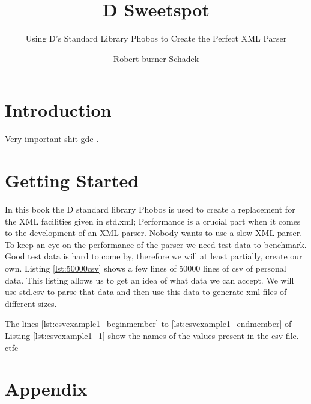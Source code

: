 \documentclass[a4paper,openright,BCOR20mm]{scrbook}
\author{Robert burner Schadek}
\title{D Sweetspot}
\subtitle{Using D's Standard Library Phobos to Create the Perfect XML Parser}
\begin{document}
\maketitle
\tableofcontents

\chapter{Introduction}
Very important shit \gls{gdc} \cite{Alexandrescu:2010}.

\chapter{Getting Started}
In this book the D standard library Phobos is used to create a replacement for
the XML facilities given in std.xml;
Performance is a crucial part when it comes to the development of an XML parser.
Nobody wants to use a slow XML parser.
To keep an eye on the performance of the parser we need test data to
benchmark.
Good test data is hard to come by, therefore we will at least partially,
create our own.
Listing \ref{lst:50000csv} shows a few lines of 50000 lines of \gls{csv} of
personal data.
%
This listing allows us to get an idea of what data we can accept.
We will use std.csv to parse that data and then use this data to generate
\gls{xml} files of different sizes.

The lines \ref{lst:csvexample1_beginmember} to \ref{lst:csvexample1_endmember}
of Listing \ref{lst:csvexample1_1} show the names of the values present in the csv
file.
\gls{ctfe}

%
%

\chapter*{Appendix}
\appendix
{} \label{appendix}
\cleardoublepage

\label{glossary}
\printnoidxglossary

\cleardoublepage
{}\label{acronyms}
\printnoidxglossary[type=acronym]

\cleardoublepage
{}\label{figures}
\listoffigures
 
\cleardoublepage
{}\label{tables}
\listoftables

\cleardoublepage
{}\label{listings}
\lstlistoflistings

\cleardoublepage
{}\label{bibliography}
%
%
\printbibliography

\end{document}
